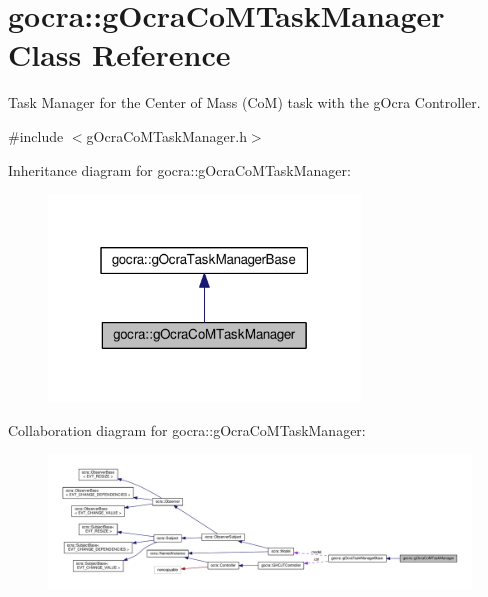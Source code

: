 \hypertarget{classgocra_1_1gOcraCoMTaskManager}{}\section{gocra\+:\+:g\+Ocra\+Co\+M\+Task\+Manager Class Reference}
\label{classgocra_1_1gOcraCoMTaskManager}


Task Manager for the Center of Mass (CoM) task with the g\+Ocra Controller.  




{\ttfamily \#include $<$g\+Ocra\+Co\+M\+Task\+Manager.\+h$>$}



Inheritance diagram for gocra\+:\+:g\+Ocra\+Co\+M\+Task\+Manager\+:
\nopagebreak
\begin{figure}[H]
\begin{center}
\leavevmode
\includegraphics[width=235pt]{df/d4a/classgocra_1_1gOcraCoMTaskManager__inherit__graph}
\end{center}
\end{figure}


Collaboration diagram for gocra\+:\+:g\+Ocra\+Co\+M\+Task\+Manager\+:
\nopagebreak
\begin{figure}[H]
\begin{center}
\leavevmode
\includegraphics[width=350pt]{da/db3/classgocra_1_1gOcraCoMTaskManager__coll__graph}
\end{center}
\end{figure}

